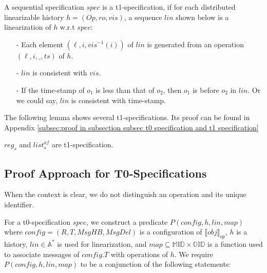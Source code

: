 \begin{definition}[t1-specification]
\label{definition:t1-specification}
A sequential specification $\mathit{spec}$ is a t1-specification, if for each distributed linearizable history $h=(\mathit{Op},\mathit{ro},\mathit{vis})$, a sequence $\mathit{lin}$ shown below is a linearization of $h$ w.r.t $\mathit{spec}$:

\begin{itemize}
\setlength{\itemsep}{0.5pt}
\item[-] Each element $(\ell,i,\mathit{vis}^{-1}(i))$ of $\mathit{lin}$ is generated from an operation $(\ell,i,\_,\mathit{ts})$ of $h$.

\item[-] $\mathit{lin}$ is consistent with $\mathit{vis}$.

\item[-] If the time-stamp of $o_1$ is less than that of $o_2$, then $o_1$ is before $o_2$ in $\mathit{lin}$. Or we could say, $\mathit{lin}$ is consistent with time-stamp. 
\end{itemize}
\end{definition}

The following lemma shows several t1-specifications. Its proof can be found in Appendix \ref{subsec:proof in subsection subsec t0 specification and t1 specification}

\begin{lemma}
\label{lemma:several t1-specifications}
$\mathit{reg}_s$ and $\mathit{list}_s^{\mathit{af}}$ are t1-specification. 
\end{lemma}






\subsection{Proof Approach for T0-Specifications}
\label{subsec:proof approach for t0-specifications}

When the context is clear, we do not distinguish an operation and its unique identifier.

For a t0-specification $\mathit{spec}$, we construct a predicate $P(\mathit{config},h,\mathit{lin},\mathit{map})$ where $\mathit{config} = (R,T,\mathit{MsgHB},\mathit{MsgDel})$ is a configuration of $\llbracket \mathit{obj} \rrbracket_{\mathit{op}}$, $h$ is a history, $\mathit{lin} \in \mathbb{A}^*$ is used for linearization, and $\mathit{map} \subseteq \mathbb{MID} \times \mathbb{OID}$ is a function used to associate messages of $\mathit{config}.T$ with operations of $h$. We require $P(\mathit{config},h,\mathit{lin},\mathit{map})$ to be a conjunction of the following statements:


